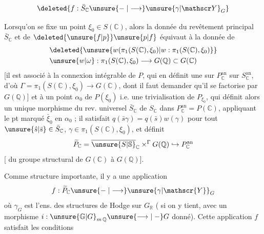 \[
\deleted{f:\bar S_{\mathbb C}\unsure{\relbar|\longrightarrow}\unsure{\gamma|\mathscr Y}_{G}}
\]



Lorsqu'on se fixe un point $\xi_0\in S(\mathbb{C})$,\deleted{\unsure{$\xi$|,}} alors la donnée du revêtement principal $\bar S_{\mathbb{C}}$ et de $\deleted{\unsure{f|p}}\unsure{p|f}$ équivaut à la donnée de
\[
\begin{aligned}
&\deleted{\unsure{w(\pi_1(S(\mathbb{C}),\xi_0)|w:\pi_1(S(\mathbb{C}),\xi_0)}}\\
&\unsure{w|\omega}:\pi_1(S(\mathbb{C}),\xi_0)\longrightarrow G(\mathbb{Q})\subset G(\mathbb{C})
\end{aligned}
\]
[il est associé à la connexion intégrable de $P$, qui en définit une sur $P_{\mathbb{C}}^{\mathrm{an}}$ sur $S_{\mathbb{C}}^{\mathrm{an}}$, d'où $\Gamma=\pi_1(S(\mathbb{C}),\xi_0)\longrightarrow G(\mathbb{C})$, dont il faut demander qu'il se factorise par $G(\mathbb{Q})$] et à un  point $\alpha_0$ de $P(\xi_0)$ i.e. une trivialisation de $P_{\xi_0}$, qui définit alors un unique morphisme  du rev. universel $\bar S_{\mathbb{C}}$ de $S_{\mathbb{C}}$ dans $P_{\mathbb{C}}^{\mathrm{an}}=P(\mathbb{C})$, appliquant le pt marqué $\bar\xi_0$ en $\alpha_0$ ; il satisfait  $q(\bar s\gamma)=q(\bar s)w(\gamma)$ pour tout $\unsure{\hat s|\bar s}\in\bar S_{\mathbb{C}}$,  $\gamma\in\pi_1(S(\mathbb{C}),\xi_0)$,  et définit
\[
\widetilde P_{\mathbb{C}}=\overline{\unsure{S|\mathbb{S}}}_{\mathbb{C}}\mathbin{\times}^{\Gamma}G(\mathbb{Q})\hookrightarrow P_{\mathbb{C}}^{\mathrm{an}}
\]
[ du groupe structural  de $G(\mathbb{C})$ à $G(\mathbb{Q})$].

Comme structure importante, il y a une application
\[
f:\widetilde P_{\mathbb{C}}\unsure{\relbar|\longrightarrow}\unsure{\gamma|\mathscr{Y}}_G
\]
où $\gamma_G$ est l'ens. des structures de Hodge sur $G_{\mathbb{R}}$ ( si on y tient, avec un morphisme $i:\unsure{\mathbb{G}|G}_{m\,\mathbb{Q}}\unsure{\longrightarrow|\relbar}G$ donné). Cette application $f$ satisfait les conditions

